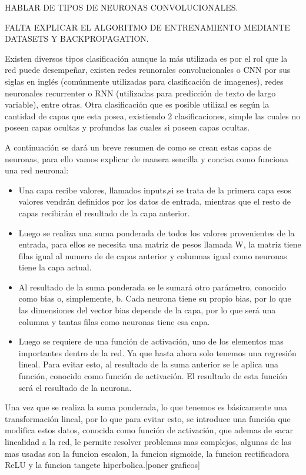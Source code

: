 HABLAR DE TIPOS DE NEURONAS CONVOLUCIONALES.

FALTA EXPLICAR EL ALGORITMO DE ENTRENAMIENTO MEDIANTE DATASETS Y BACKPROPAGATION.

Existen diversos tipos clasificación aunque la más utilizada es por el rol que la red puede desempeñar, existen redes reunorales convolucionales o CNN por sus siglas en inglés (comúnmente utilizadas para clasificación de imagenes),
redes neuronales recurrenter o RNN (utilizadas para predicción de texto de largo variable), entre otras. Otra clasificación que es posible utilizal es según la cantidad de capas que esta posea, existiendo 2 clasificaciones, simple las cuales no poseen capas ocultas y profundas las cuales si poseen capas ocultas.

A continuación se dará un breve resumen de como se crean estas capas de neuronas, para ello vamos explicar de manera sencilla y concisa como funciona una red neuronal:
\begin{itemize}
    \item Una capa recibe valores, llamados inputs,si se trata de la primera capa esos valores vendrán definidos por los datos de entrada, mientras que el resto de capas recibirán el resultado de la capa anterior.
    \item Luego se realiza una suma ponderada de todos los valores provenientes de la entrada, para ellos se necesita una matriz de pesos llamada W, la matriz tiene filas igual al numero de de capas anterior y columnas igual como neuronas tiene la capa actual.
    \item Al resultado de la suma ponderada se le sumará otro parámetro, conocido como bias o, simplemente, b. Cada neurona tiene su propio bias, por lo que las dimensiones del vector bias depende de la capa, por lo que será una columna y tantas filas como neuronas tiene esa capa.
    \item Luego se requiere de una función de activación, uno de los elementos mas importantes dentro de la red. Ya que hasta ahora solo tenemos una regresión lineal. Para evitar esto, al resultado de la suma anterior se le aplica una función, conocido como función de activación. El resultado de esta función será el resultado de la neurona.
\end{itemize}

Una vez que se realiza la suma ponderada, lo que tenemos es básicamente una transformación lineal, por lo que para evitar esto, se introduce una función que modifica estos datos, conocida como función de activación, que ademas de sacar linealidad a la red, le permite resolver problemas mas complejos, algunas de las mas usadas son la funcion escalon, la funcion sigmoide, la funcion rectificadora ReLU y la funcion tangete hiperbolica.[poner graficos]


